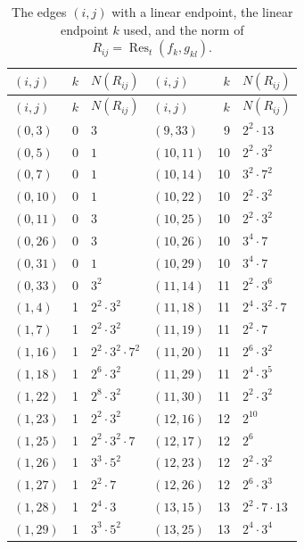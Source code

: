 \documentclass[11pt]{article}
\begin{document}
\begingroup\small
\setlength{\LTcapwidth}{\textwidth}
\begin{longtable}{@{}lrl@{\qquad}lrl@{}}
\caption{The edges $(i,j)$ with a linear endpoint, the linear endpoint $k$ used, and the norm of $R_{ij}=\operatorname{Res}_t(f_k,g_{kl})$.}\label{tab:sep}\\
\hline $(i,j)$ & $k$ & $N(R_{ij})$ & $(i,j)$ & $k$ & $N(R_{ij})$\\\hline\endfirsthead\hline $(i,j)$ & $k$ & $N(R_{ij})$ & $(i,j)$ & $k$ & $N(R_{ij})$\\\hline\endhead\hline\endfoot
$(0,3)$ & 0 & $3$ & $(9,33)$ & 9 & $2^{2}\cdot 13$\\
$(0,5)$ & 0 & $1$ & $(10,11)$ & 10 & $2^{2}\cdot 3^{2}$\\
$(0,7)$ & 0 & $1$ & $(10,14)$ & 10 & $3^{2}\cdot 7^{2}$\\
$(0,10)$ & 0 & $1$ & $(10,22)$ & 10 & $2^{2}\cdot 3^{2}$\\
$(0,11)$ & 0 & $3$ & $(10,25)$ & 10 & $2^{2}\cdot 3^{2}$\\
$(0,26)$ & 0 & $3$ & $(10,26)$ & 10 & $3^{4}\cdot 7$\\
$(0,31)$ & 0 & $1$ & $(10,29)$ & 10 & $3^{4}\cdot 7$\\
$(0,33)$ & 0 & $3^{2}$ & $(11,14)$ & 11 & $2^{2}\cdot 3^{6}$\\
$(1,4)$ & 1 & $2^{2}\cdot 3^{2}$ & $(11,18)$ & 11 & $2^{4}\cdot 3^{2}\cdot 7$\\
$(1,7)$ & 1 & $2^{2}\cdot 3^{2}$ & $(11,19)$ & 11 & $2^{2}\cdot 7$\\
$(1,16)$ & 1 & $2^{2}\cdot 3^{2}\cdot 7^{2}$ & $(11,20)$ & 11 & $2^{6}\cdot 3^{2}$\\
$(1,18)$ & 1 & $2^{6}\cdot 3^{2}$ & $(11,29)$ & 11 & $2^{4}\cdot 3^{5}$\\
$(1,22)$ & 1 & $2^{8}\cdot 3^{2}$ & $(11,30)$ & 11 & $2^{2}\cdot 3^{2}$\\
$(1,23)$ & 1 & $2^{2}\cdot 3^{2}$ & $(12,16)$ & 12 & $2^{10}$\\
$(1,25)$ & 1 & $2^{2}\cdot 3^{2}\cdot 7$ & $(12,17)$ & 12 & $2^{6}$\\
$(1,26)$ & 1 & $3^{3}\cdot 5^{2}$ & $(12,23)$ & 12 & $2^{2}\cdot 3^{2}$\\
$(1,27)$ & 1 & $2^{2}\cdot 7$ & $(12,26)$ & 12 & $2^{6}\cdot 3^{3}$\\
$(1,28)$ & 1 & $2^{4}\cdot 3$ & $(13,15)$ & 13 & $2^{2}\cdot 7\cdot 13$\\
$(1,29)$ & 1 & $3^{3}\cdot 5^{2}$ & $(13,25)$ & 13 & $2^{4}\cdot 3^{4}$\\

\end{longtable}
\end{document}
